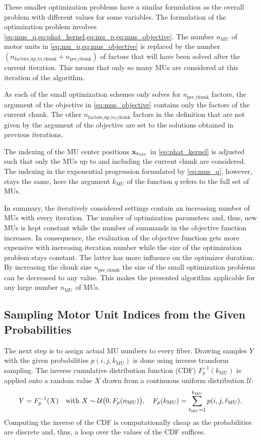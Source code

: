 These smaller optimization problems have a similar formulation as the overall problem with different values for some variables.
The formulation of the optimization problem involves \cref{eq:mus_q,eq:phat_kernel,eq:mu_p,eq:mus_objective}. 
The number $n_\text{MU}$ of motor units in \cref{eq:mu_p,eq:mus_objective} is replaced by the number $(n_\text{factors\_up\_to\_chunk}+n_\text{per\_chunk})$ of factors that will have been solved after the current iteration. This means that only so many MUs are considered at this iteration of the algorithm.

As each of the small optimization schemes only solves for $n_\text{per\_chunk}$ factors, the argument of the objective in \cref{eq:mus_objective} contains only the factors of the current chunk.
The other $n_\text{factors\_up\_to\_chunk}$ factors in the definition that are not given by the argument of the objective are set to the solutions obtained in previous iterations.

The indexing of the MU center positions $\textbf{x}_{k_\text{MU}}$ in \cref{eq:phat_kernel} is adjusted such that only the MUs up to and including the current chunk are considered. The indexing in the exponential progression formulated by \cref{eq:mus_q}, however, stays the same, here the argument $k_\text{MU}$ of the function $q$ refers to the full set of MUs.

In summary, the iteratively considered settings contain an increasing number of MUs with every iteration. The number of optimization parameters and, thus, new MUs is kept constant while the number of summands in the objective function increases. In consequence, the evaluation of the objective function gets more expensive with increasing iteration number while the size of the optimization problem stays constant. The latter has more influence on the optimizer duration.
By increasing the chunk size $n_\text{per\_chunk}$ the size of the small optimization problems can be decreased to any value. This makes the presented algorithm applicable for any large number $n_\text{MU}$ of MUs.

\subsection{Sampling Motor Unit Indices from the Given Probabilities}

The next step is to assign actual MU numbers to every fiber. Drawing samples $Y$ with the given probabilities $p(i,j,k_\text{MU})$ is done using inverse transform sampling. The inverse cumulative distribution function (CDF) $F_p^{-1}(k_\text{MU})$ is applied onto a random value $X$ drawn from a continuous uniform distribution $\mathcal{U}$:
\begin{align*}
  Y = F_p^{-1}(X)\quad \text{with }X\sim \mathcal{U}\big(0,F_p(n_\text{MU})\big), \quad F_p(k_\text{MU}) = \displaystyle\sum\limits_{\ell_\text{MU}=1}^{k_\text{MU}} p(i,j,\ell_\text{MU}).
\end{align*}
Computing the inverse of the CDF is computationally cheap as the probabilities are discrete and, thus, a loop over the values of the CDF suffices.

